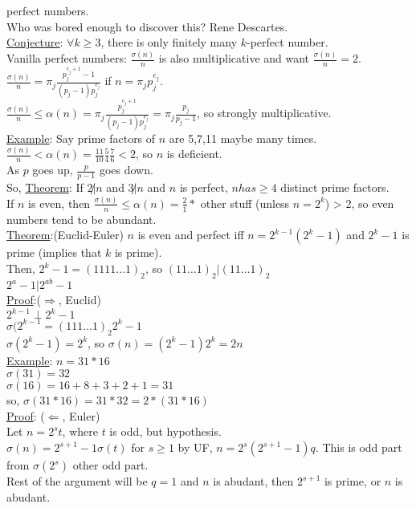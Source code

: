 \documentclass[13pt]{article}
\begin{document}
	perfect numbers.\\
	Who was bored enough to discover this? Rene Descartes.\\
	\underline{Conjecture}: $\forall k \ge 3$, there is only finitely many
	$k$-perfect number.\\
	Vanilla perfect numbers: $\frac{\sigma(n)}{n}$ is also multiplicative and
	want $\frac{\sigma(n)}{n} = 2$.\\
	$\frac{\sigma(n)}{n} = \pi_j \frac{p_j^{e_j + 1} - 1}{(p_j - 1)p_j^{e_j}}$
	if $n = \pi_j p_j^{e_j}$.\\
	$\frac{\sigma(n)}{n} \le \alpha(n) = \pi_j \frac{p_j^{e_j + 1}}{(p_j - 1)
	p_j^{e_j}} = \pi_j \frac{p_j}{p_j - 1}$, so strongly multiplicative.\\
	\underline{Example}: Say prime factors of $n$ are 5,7,11 maybe many times.\\
	$\frac{\sigma(n)}{n} < \alpha(n) = \frac{11}{10}\frac{5}{4}\frac{7}{6} < 2$,
	so $n$ is deficient.\\
	As $p$ goes up, $\frac{p}{p-1}$ goes down.\\
	So, \underline{Theorem}: If $2 \not| n$ and $ 3\not| n$ and $n$ is perfect,
	$n has \ge 4$ distinct prime factors.\\
	If $n$ is even, then $\frac{\sigma(n)}{n} \le \alpha(n) = \frac{2}{1} *$
	other stuff (unless $n = 2^k$) > 2, so even numbers tend to be abundant.\\
	\underline{Theorem}:(Euclid-Euler) $n$ is even and perfect iff $n = 2^{k -1}
	(2^k - 1)$ and $2^k - 1$ is prime (implies that $k$ is prime).\\
	Then, $2^k - 1 = (1111\ldots 1)_2$, so $(11\ldots 1)_2 | (11\ldots 1)_2$\\
	$2^a - 1 | 2^{ab} - 1$\\
	\underline{Proof}:($\Rightarrow$, Euclid)\\
		$2^{k - 1} \perp 2^{k} - 1$\\
		$\sigma(2^{k - 1} = (111 \ldots 1)_2 2^k - 1$\\
		$\sigma(2^k-1) = 2^k$, so $\sigma(n) = (2^k - 1) 2^k = 2n$\\
		\underline{Example}: $n = 31*16$\\
		$\sigma(31) = 32$\\
		$\sigma(16) = 16 + 8 + 3 + 2 + 1 = 31$\\
		so, $\sigma(31*16) = 31 * 32 = 2 * (31 * 16)$\\
	\underline{Proof}: ($\Leftarrow$, Euler)\\
		Let $n = 2^s t$, where $t$ is odd, but hypothesis.\\
		$\sigma(n) = 2^{s + 1} - 1 \sigma(t)$ for $s \ge 1$ by UF, $n = 2^s(
		2^{s+1} - 1)q$. This is odd part from $\sigma(2^s)$ other odd part.\\
		Rest of the argument will be $q = 1$ and $n$ is abudant, then $2^{s + 1}$
		is prime, or $n$ is abudant.
	
\end{document}

